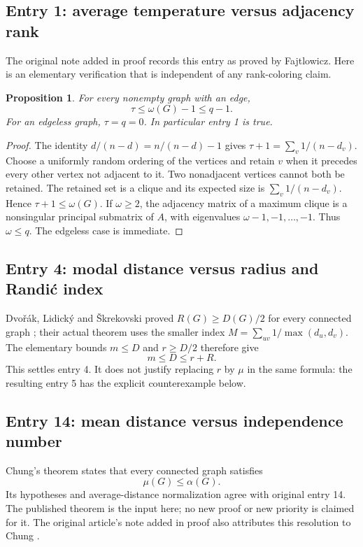 \documentclass[11pt,a4paper]{article}
\newtheorem{proposition}[theorem]{Proposition}
\theoremstyle{remark}\newtheorem{remark}[theorem]{Remark}
\begin{document}
\subsection{Entry 1: average temperature versus adjacency rank}
The original note added in proof records this entry as proved by Fajtlowicz.
Here is an elementary verification that is independent of any rank-coloring
claim.
\begin{proposition}\label{prop:temperature}
For every nonempty graph with an edge,
\[
 \tau\le\omega(G)-1\le q-1.
\]
For an edgeless graph, $\tau=q=0$. In particular entry 1 is true.
\end{proposition}
\begin{proof}
The identity $d/(n-d)=n/(n-d)-1$ gives
$\tau+1=\sum_v1/(n-d_v)$. Choose a uniformly random ordering of the
vertices and retain $v$ when it precedes every other vertex not adjacent to it.
Two nonadjacent vertices cannot both be retained. The retained set is a
clique and its expected size is $\sum_v1/(n-d_v)$. Hence
$\tau+1\le\omega(G)$. If $\omega\ge2$, the adjacency matrix of a
maximum clique is a nonsingular principal submatrix of $A$, with eigenvalues
$\omega-1,-1,\ldots,-1$. Thus $\omega\le q$. The edgeless case is immediate.
\end{proof}

\subsection{Entry 4: modal distance versus radius and Randi\'c index}
Dvo\v{r}\'ak, Lidick\'y and \v{S}krekovski proved
$R(G)\ge D(G)/2$ for every connected graph \cite{dls}; their actual theorem
uses the smaller index $M=\sum_{uv}1/\max(d_u,d_v)$. The elementary bounds
$m\le D$ and $r\ge D/2$ therefore give
\[
 m\le D\le r+R.
\]
This settles entry 4. It does not justify replacing $r$ by $\mu$ in the
same formula: the resulting entry 5 has the explicit counterexample below.

\subsection{Entry 14: mean distance versus independence number}
Chung's theorem \cite{chung} states that every connected graph satisfies
\[
 \mu(G)\le\alpha(G).
\]
Its hypotheses and average-distance normalization agree with original
entry 14. The published theorem is the input here; no new proof or new
priority is claimed for it. The original article's note added in proof
also attributes this resolution to Chung \cite[p.~118]{fajtlowicz}.
\end{document}

